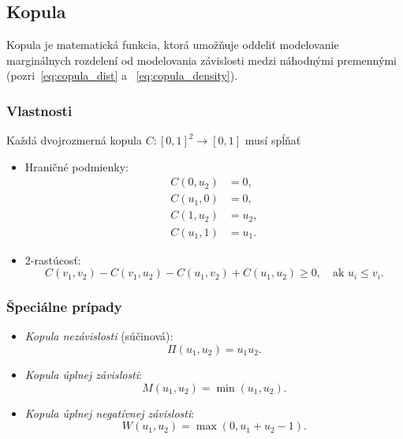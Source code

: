 \subsection{Kopula}
\label{subsec:copulas}

Kopula je matematická funkcia, ktorá umožňuje oddeliť modelovanie marginálnych rozdelení od modelovania závislosti medzi náhodnými premennými (pozri~\ref{eq:copula_dist} a ~\ref{eq:copula_density}).

\subsubsection{Vlastnosti}

Každá dvojrozmerná kopula $C: [0,1]^2 \to [0,1]$ musí spĺňať

\begin{itemize}
  \item Hraničné podmienky:
    \begin{align*}
        C(0, u_2) &= 0, \\
        C(u_1, 0) &= 0, \\
        C(1, u_2) &= u_2, \\
        C(u_1, 1) &= u_1.
    \end{align*}
  \item 2-rastúcosť:
  \begin{equation}
    C(v_1, v_2) - C(v_1, u_2) - C(u_1, v_2) + C(u_1, u_2) \geq 0, \quad \text{ak } u_i \leq v_i.
  \end{equation}
\end{itemize}

\subsubsection{Špeciálne prípady}

\begin{itemize}
  \item \textit{Kopula nezávislosti} (súčinová):
  \begin{equation}
  \Pi(u_1, u_2) = u_1 u_2.
  \end{equation}
  \item \textit{Kopula úplnej závislosti}:
  \begin{equation}
  M(u_1,u_2) = \min(u_1, u_2).
  \end{equation}
  \item \textit{Kopula úplnej negatívnej závislosti}:
  \begin{equation}
  W(u_1, u_2) = \max(0, u_1 + u_2 - 1).
  \end{equation}
\end{itemize}

